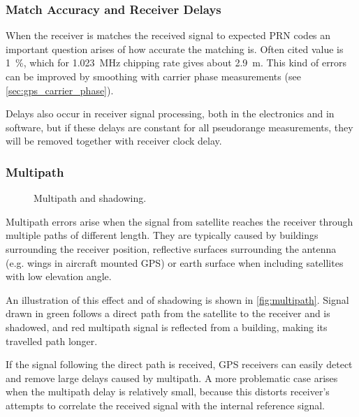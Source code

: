 
\subsubsection{Match Accuracy and Receiver Delays}

When the receiver is matches the received signal to expected PRN codes an 
important question arises of how accurate the matching is.
Often cited value is \SI{1}{\percent}, which for \SI{1.023}{\mega\hertz}
chipping rate gives about \SI{2.9}{\meter}.
This kind of errors can be improved by smoothing with carrier phase measurements (see
\autoref{sec:gps_carrier_phase}).

Delays also occur in receiver signal processing, both in the electronics and in software,
but if these delays are constant for all pseudorange measurements, they will be removed
together with receiver clock delay.

\subsubsection{Multipath}

\begin{figure}[t]
	\centering
	
	\caption{Multipath and shadowing.}
	\label{fig:multipath}
\end{figure}

Multipath errors arise when the signal from satellite reaches the receiver
through multiple paths of different length.
They are typically caused by buildings surrounding the receiver position,
reflective surfaces surrounding the antenna (e.g. wings in aircraft mounted GPS) or earth surface
when including satellites with low elevation angle.

An illustration of this effect and of shadowing is shown in \autoref{fig:multipath}.
Signal drawn in green follows a direct path from the satellite to the receiver and is shadowed,
and red multipath signal is reflected from a building, making its travelled path longer.

If the signal following the direct path is received, GPS receivers can easily detect and remove large delays caused by multipath.
A more problematic case arises when the multipath delay is relatively small, because this distorts
receiver's attempts to correlate the received signal with the internal reference signal.

